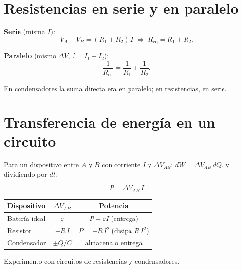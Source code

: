 \documentclass[12pt,a4paper]{article}
\begin{document}


\section{Resistencias en serie y en paralelo}

\textbf{Serie} (misma $I$):
\[
V_A - V_B = (R_1+R_2)\,I \;\Longrightarrow\; \boxed{R_{\text{eq}} = R_1 + R_2}.
\]

\textbf{Paralelo} (mismo $\Delta V$, $I = I_1+I_2$):
\[
\boxed{\frac{1}{R_{\text{eq}}} = \frac{1}{R_1} + \frac{1}{R_2}}.
\]

\begin{warnbox}
  En condensadores la suma directa era en paralelo; en resistencias, en
  serie.
\end{warnbox}



\section{Transferencia de energía en un circuito}

Para un dispositivo entre $A$ y $B$ con corriente $I$ y $\Delta V_{AB}$:
$dW = \Delta V_{AB}\,dQ$, y dividiendo por $dt$:

\begin{keybox}
  \[
  \boxed{P = \Delta V_{AB}\, I}
  \]
\end{keybox}

\begin{center}
\begin{tabular}{lcc}
\toprule
\textbf{Dispositivo} & $\Delta V_{AB}$ & \textbf{Potencia} \\
\midrule
Batería ideal & $\varepsilon$ & $P = \varepsilon I$ (entrega) \\
Resistor & $-R\,I$ & $P = -R\,I^2$ (disipa $R\,I^2$) \\
Condensador & $\pm Q/C$ & almacena o entrega \\
\bottomrule
\end{tabular}
\end{center}

\begin{notebox}
  Experimento con circuitos de resistencias y condensadores.
\end{notebox}


\end{document}

